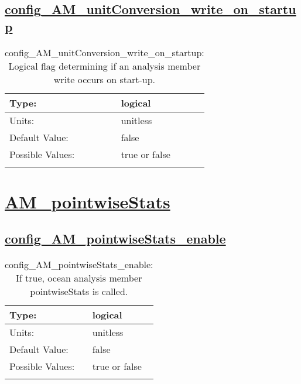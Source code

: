\subsection[config\_AM\_unitConversion\_write\_on\_startup]{\hyperref[sec:nm_tab_AM_unitConversion]{config\_AM\_unitConversion\_write\_on\_startup}}
\label{subsec:nm_sec_config_AM_unitConversion_write_on_startup}
\begin{center}
\begin{longtable}{| p{2.0in} || p{4.0in} |}
    \hline
    Type: & logical \\
    \hline
    Units: & \si{unitless} \\
    \hline
    Default Value: & false \\
    \hline
    Possible Values: & true or false \\
    \hline
    \caption{config\_AM\_unitConversion\_write\_on\_startup: Logical flag determining if an analysis member write occurs on start-up.}
\end{longtable}
\end{center}
\section[AM\_pointwiseStats]{\hyperref[sec:nm_tab_AM_pointwiseStats]{AM\_pointwiseStats}}
\label{sec:nm_sec_AM_pointwiseStats}
\subsection[config\_AM\_pointwiseStats\_enable]{\hyperref[sec:nm_tab_AM_pointwiseStats]{config\_AM\_pointwiseStats\_enable}}
\label{subsec:nm_sec_config_AM_pointwiseStats_enable}
\begin{center}
\begin{longtable}{| p{2.0in} || p{4.0in} |}
    \hline
    Type: & logical \\
    \hline
    Units: & \si{unitless} \\
    \hline
    Default Value: & false \\
    \hline
    Possible Values: & true or false \\
    \hline
    \caption{config\_AM\_pointwiseStats\_enable: If true, ocean analysis member pointwiseStats is called.}
\end{longtable}
\end{center}

